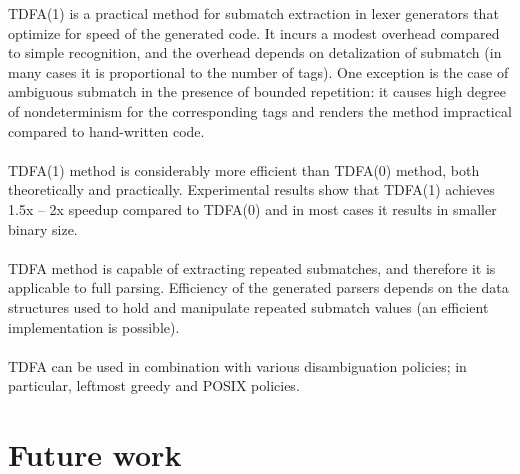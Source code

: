 \documentclass{article}
\theoremstyle{definition}
\begin{document}
\begin{multicols}{2}
TDFA(1) is a practical method for submatch extraction in lexer generators that optimize for speed of the generated code.
It incurs a modest overhead compared to simple recognition,
and the overhead depends on detalization of submatch
(in many cases it is proportional to the number of tags).
One exception is the case of ambiguous submatch in the presence of bounded repetition:
it causes high degree of nondeterminism for the corresponding tags
and renders the method impractical compared to hand-written code.
\\ \\
TDFA(1) method is considerably more efficient than TDFA(0) method, both theoretically and practically.
Experimental results show that TDFA(1) achieves 1.5x -- 2x speedup compared to TDFA(0)
and in most cases it results in smaller binary size.
\\ \\
TDFA method is capable of extracting repeated submatches,
and therefore it is applicable to full parsing.
Efficiency of the generated parsers depends on the data structures used to hold and manipulate repeated submatch values
(an efficient implementation is possible).
\\ \\
TDFA can be used in combination with various disambiguation policies;
in particular, leftmost greedy and POSIX policies.


\section{Future work}\label{section_future_work}


\end{multicols}
\end{document}
